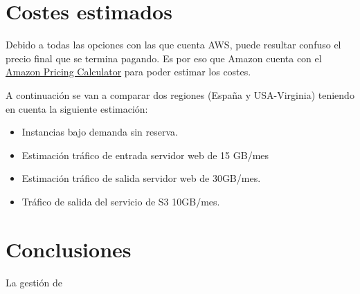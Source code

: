 \documentclass{\ClassPath/viu-tfm-template}
\begin{document}
\chapter{Costes estimados}
Debido a todas las opciones con las que cuenta AWS, puede resultar confuso el precio final que se termina pagando. Es por eso que Amazon cuenta con el \href{https://calculator.aws/}{Amazon Pricing Calculator} para poder estimar los costes.

A continuación se van a comparar dos regiones (España y USA-Virginia) teniendo en cuenta la siguiente estimación:

\begin{itemize}
    \item Instancias bajo demanda sin reserva.
    \item Estimación tráfico de entrada servidor web de 15 GB/mes
    \item Estimación tráfico de salida servidor web de 30GB/mes.
    \item Tráfico de salida del servicio de S3 10GB/mes.
\end{itemize}




\chapter{Conclusiones}

La gestión de
\end{document}
